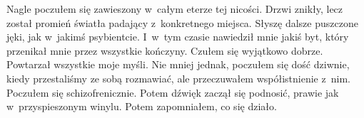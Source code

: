 Nagle poczułem się zawieszony w~całym eterze tej nicości. Drzwi znikły, lecz został promień światła padający z~konkretnego miejsca. Słyszę dalsze puszczone jęki, jak w~jakimś psybientcie. I~w~tym czasie nawiedził mnie jakiś byt, który przenikał mnie przez wszystkie kończyny. Czułem się wyjątkowo dobrze. Powtarzał wszystkie moje myśli. Nie mniej jednak, poczułem się dość dziwnie, kiedy przestaliśmy ze sobą rozmawiać, ale przeczuwałem współistnienie z~nim. Poczułem się schizofrenicznie. Potem dźwięk zaczął się podnosić, prawie jak w~przyspieszonym winylu. Potem zapomniałem, co się działo.
